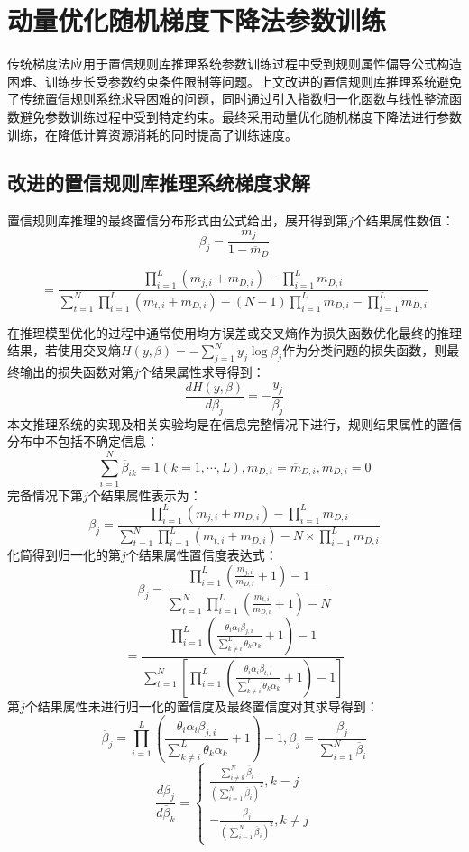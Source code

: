 \documentclass{cjc}
\begin{document}
\section{动量优化随机梯度下降法参数训练}
传统梯度法应用于置信规则库推理系统参数训练过程中受到规则属性偏导公式构造困难、训练步长受参数约束条件限制等问题。上文改进的置信规则库推理系统避免了传统置信规则系统求导困难的问题，同时通过引入指数归一化函数与线性整流函数避免参数训练过程中受到特定约束。最终采用动量优化随机梯度下降法进行参数训练，在降低计算资源消耗的同时提高了训练速度。
\subsection{改进的置信规则库推理系统梯度求解}
置信规则库推理的最终置信分布形式由公式给出，展开得到第$j$个结果属性数值：
$$\beta_j=\frac{m_j}{1-\overline{m}_D}$$
\begin{small}
$$=\frac{\prod_{i=1}^L(m_{j,i}+m_{D,i})-\prod_{i=1}^Lm_{D,i}}{\sum_{t=1}^N\prod_{i=1}^L(m_{t,i}+m_{D,i})-(N-1)\prod_{i=1}^Lm_{D,i}-\prod_{i=1}^L\overline{m}_{D,i}}$$
\end{small}
在推理模型优化的过程中通常使用均方误差或交叉熵\cite{a16}作为损失函数优化最终的推理结果，若使用交叉熵$H(y,\beta)=-\sum_{j=1}^Ny_j\log\beta_j$作为分类问题的损失函数，则最终输出的损失函数对第$j$个结果属性求导得到：
$$\frac{dH(y,\beta)}{d\beta_j}=-\frac{y_j}{\beta_j}$$
本文推理系统的实现及相关实验均是在信息完整情况下进行，规则结果属性的置信分布中不包括不确定信息：
$$\sum_{i=1}^N\overline{\beta}_{ik}=1(k=1,\cdots,L),m_{D,i}=\overline{m}_{D,i},\widetilde{m}_{D,i}=0$$
完备情况下第$j$个结果属性表示为：
$$\beta_j=\frac{\prod_{i=1}^L(m_{j,i}+m_{D,i})-\prod_{i=1}^Lm_{D,i}}{\sum_{t=1}^N\prod_{i=1}^L(m_{t,i}+m_{D,i})-N\times\prod_{i=1}^Lm_{D,i}}$$
化简得到归一化的第$j$个结果属性置信度表达式：
$$\beta_j=\frac{\prod_{i=1}^{L}(\frac{m_{j,i}}{m_{D,i}}+1)-1}{\sum_{t=1}^{N}\prod_{i=1}^{L}(\frac{m_{t,i}}{m_{D,i}}+1)-N}$$
$$=\frac{\prod_{i=1}^{L}(\frac{\theta_i\alpha_i\beta_{j,i}}{\sum_{k\neq i}^L{\theta_k\alpha_k}}+1)-1}{\sum_{t=1}^{N}[\prod_{i=1}^{L}(\frac{\theta_i\alpha_i\beta_{t,i}}{\sum_{k\neq i}^L{\theta_k\alpha_k}}+1)-1]}$$
第$j$个结果属性未进行归一化的置信度及最终置信度对其求导得到：
$$\overline{\beta}_j=\prod_{i=1}^L(\frac{\theta_i\alpha_i\beta_{j,i}}{\sum_{k\neq i}^L{\theta_k\alpha_k}}+1)-1,\beta_j=\frac{\overline{\beta}_j}{\sum_{i=1}^N\overline{\beta}_i}$$
$$\frac{d\beta_j}{d\overline{\beta}_k}=
\left\{
\begin{aligned}
\frac{\sum_{i\neq k}^N\overline{\beta}_i}{(\sum_{i=1}^N\overline{\beta}_i)^2},k=j\\
-\frac{\beta_j}{(\sum_{i=1}^N\overline{\beta}_i)^2},k\neq j
\end{aligned}
\right.
$$
\end{document}
